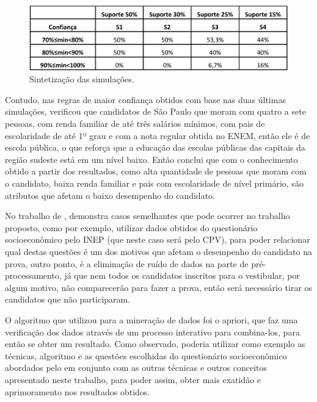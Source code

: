 \begin{figure}[!htp]
	\begin{center}
    \caption{\label{fig:waveform_fig} Sintetização das simulações.}
	\includegraphics[scale=0.49]{Figuras/Sintetizacao_simulacoes.png}
	\end{center}
\end{figure}

\par
Contudo, nas regras de maior confiança obtidos com base nas duas últimas simulações,  verificou que candidatos de São Paulo que moram com quatro a sete pessoas, com renda familiar de até três salários mínimos, com pais de escolaridade de até 1º grau e com a nota regular obtida no ENEM, então ele é de escola pública, o que reforça que a educação das escolas públicas das capitais da região sudeste está em um nível baixo. Então  conclui que com o conhecimento obtido a partir dos resultados, como alta quantidade de pessoas que moram com o candidato, baixa renda familiar e pais com escolaridade de nível primário, são atributos que afetam o baixo desempenho do candidato. 

No trabalho de , demonstra casos semelhantes que pode ocorrer no trabalho proposto, como por exemplo, utilizar dados obtidos do questionário socioeconômico pelo INEP (que neste caso será pelo CPV), para poder relacionar qual destas questões é um dos motivos que afetam o desempenho do candidato na prova, outro ponto, é a eliminação de ruído de dados na parte de pré-processamento, já que nem todos os candidatos inscritos para o vestibular, por algum motivo, não comparecerão para fazer a prova, então será necessário tirar os candidatos que não participaram.

\par
O algoritmo que  utilizou para a mineração de dados foi o apriori, que faz uma verificação dos dados através de um processo interativo para combina-los, para então se obter um resultado. Como observado, poderia utilizar como exemplo as técnicas, algoritmo e as questões escolhidas do questionário socioeconômico abordados pelo  em conjunto com as outras técnicas e outros conceitos apresentado neste trabalho, para poder assim, obter mais exatidão e aprimoramento nos resultados obtidos.

